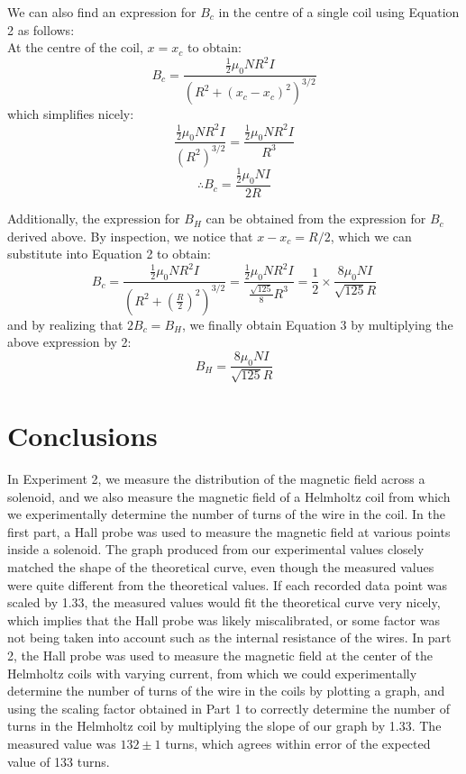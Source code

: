 \documentclass[letterpaper]{article}
\begin{document}
We can also find an expression for $B_c$ in the centre of a single coil using Equation 2 as follows:\\
At the centre of the coil, $x=x_c$ to obtain:
$$ B_c = \frac{\frac{1}{2} \mu_0NR^2I}{(R^2+(x_c-x_c)^2)^{3/2}} $$
which simplifies nicely:
$$ \frac{\frac{1}{2} \mu_0NR^2I}{(R^2)^{3/2}} = \frac{\frac{1}{2} \mu_0NR^2I}{R^3}  $$
$$ \therefore B_c = \frac{\frac{1}{2} \mu_0NI}{2R} $$

Additionally, the expression for $B_H$ can be obtained from the expression for $B_c$ derived above. By inspection,
we notice that $x-x_c=R/2$, which we can substitute into Equation 2 to obtain:
$$ B_c= \frac{\frac{1}{2}\mu_0NR^2I}{(R^2+(\frac{R}{2})^2)^{3/2}} = \frac{\frac{1}{2}\mu_0NR^2I}{\frac{\sqrt{125}}{8}R^3} = \frac{1}{2}\times \frac{8\mu_0NI}{\sqrt{125}R} $$
and by realizing that $2B_c=B_H$, we finally obtain Equation 3 by multiplying the above expression by 2:
$$B_H=\frac{8\mu_0NI}{\sqrt{125}R}$$
\section{Conclusions}

In Experiment 2, we measure the distribution of the magnetic field across a solenoid,
and we also measure the magnetic field of a Helmholtz coil from which we experimentally determine the
number of turns of the wire in the coil. In the first part, a Hall probe was used to measure the magnetic field
at various points inside a solenoid. The graph produced from our experimental values
closely matched the shape of the theoretical curve, even though the measured values were
quite different from the theoretical values. If each recorded
data point was scaled by 1.33, the measured values would fit the
theoretical curve very nicely, which implies that the Hall probe
was likely miscalibrated, or some factor was not being taken into account such as the internal resistance
of the wires. In part 2, the Hall probe was used to measure the magnetic field
at the center of the Helmholtz coils with varying current, from which we could experimentally
determine the number of turns of the wire in the coils by plotting a graph, and using the scaling factor obtained in Part 1
to correctly determine the number of turns in the Helmholtz coil by multiplying the slope of our graph by 1.33. The measured value was $132 \pm 1$ turns, which agrees
within error of the expected value of 133 turns.


\end{document}
